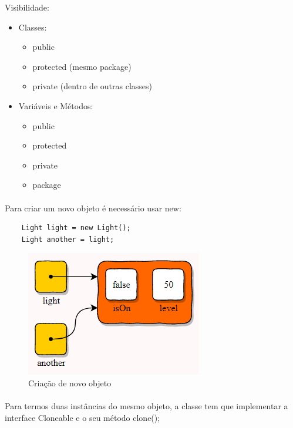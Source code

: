 \documentclass[../resumosLPOO.tex]{subfiles}
\begin{document}
Visibilidade:
\begin{itemize}
    \item Classes:
    \begin{itemize}
        \item public
        \item protected (mesmo package)
        \item private (dentro de outras classes)
    \end{itemize}
    \item Variáveis e Métodos:
    \begin{itemize}
        \item public
        \item protected
        \item private
        \item package
    \end{itemize}
\end{itemize}

\paragraph{}

Para criar um novo objeto é necessário usar new:
\begin{lstlisting}
    Light light = new Light();
    Light another = light;
\end{lstlisting}

\begin{figure}[!h]
    \centering
    \includegraphics{images/javaNewObject.PNG}
    \caption{Criação de novo objeto}
    \label{fig:javaNew Object}
\end{figure}

\paragraph{}

Para termos duas instâncias do mesmo objeto, a classe tem que implementar a interface Cloneable e o seu método clone();
\end{document}

